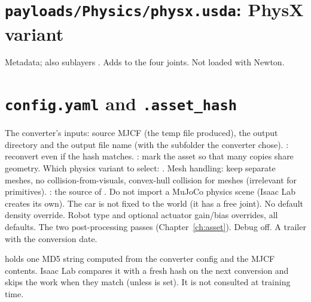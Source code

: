 \section{\texttt{payloads/Physics/physx.usda}: PhysX variant}


\begin{explain}
 Metadata; also sublayers .
 Adds  to the four joints. Not loaded with
  Newton.
\end{explain}

\section{\texttt{config.yaml} and \texttt{.asset\_hash}}


\begin{explain}
 The converter's inputs: source MJCF (the temp file
   produced), the output directory and the output file name
  (with the subfolder the converter chose).
 : reconvert even if the hash
  matches.
 : mark the asset so that many copies
  share geometry.
 Which physics variant to select: .
 Mesh handling: keep separate meshes, no collision-from-visuals,
  convex-hull collision for meshes (irrelevant for primitives).
 : the source of
  .
 Do not import a MuJoCo physics scene (Isaac Lab creates its own).
 The car is not fixed to the world (it has a free joint).
 No default density override.
 Robot type and optional actuator gain/bias overrides, all
  defaults.
 The two post-processing passes (Chapter~\ref{ch:asset}).
 Debug off.
 A trailer with the conversion date.
\end{explain}

 holds one MD5 string computed from the converter config
and the MJCF contents. Isaac Lab compares it with a fresh hash on the next
conversion and skips the work when they match (unless
 is set). It is not consulted at training time.
